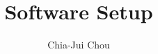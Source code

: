 \documentclass[12pt]{article}
\begin{document}
\title{Software Setup}
\author{Chia-Jui Chou}
\date{}
\maketitle
\tableofcontents
\newpage



\end{document}
